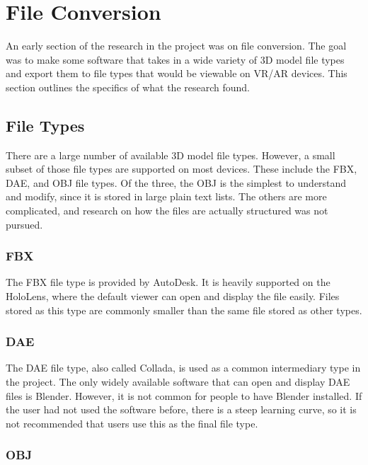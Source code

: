
\section{File Conversion}

    An early section of the research in the project was on file conversion.  The goal was to make some software that takes in a wide variety of 3D model file types and export them to file types that would be viewable on VR/AR devices.  This section outlines the specifics of what the research found.

    \subsection{File Types}

        There are a large number of available 3D model file types.  However, a small subset of those file types are supported on most devices.  These include the FBX, DAE, and OBJ file types.  Of the three, the OBJ is the simplest to understand and modify, since it is stored in large plain text lists.  The others are more complicated, and research on how the files are actually structured was not pursued.

        \subsubsection{FBX}

            The FBX file type is provided by AutoDesk.  It is heavily supported on the HoloLens, where the default viewer can open and display the file easily.  Files stored as this type are commonly smaller than the same file stored as other types.

        \subsubsection{DAE}

            The DAE file type, also called Collada, is used as a common intermediary type in the project.  The only widely available software that can open and display DAE files is Blender.  However, it is not common for people to have Blender installed.  If the user had not used the software before, there is a steep learning curve, so it is not recommended that users use this as the final file type.

        \subsubsection{OBJ}

